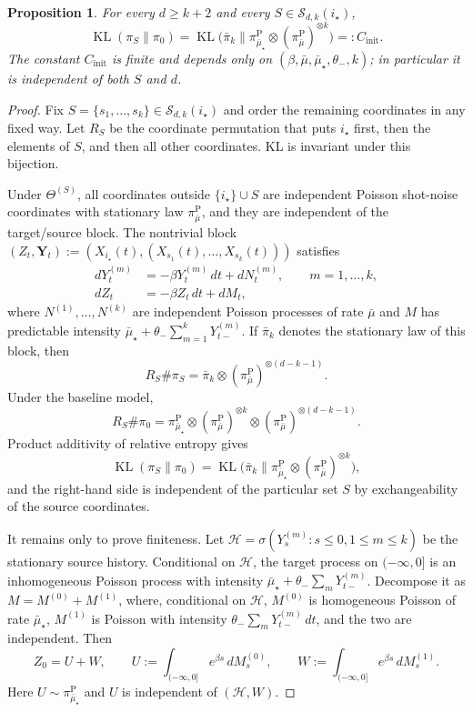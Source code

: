 \documentclass[10pt,a4paper]{amsart}
\newtheorem{proposition}{Proposition}
\newcommand{\KL}{\operatorname{KL}}
\newcommand{\thetalo}{\theta_-}
\begin{document}
\begin{proposition}
\label{prop:app-initKL-k}
For every $d\ge k+2$ and every $S\in\mathcal S_{d,k}(i_\star)$,
\[
\KL(\pi_S\|\pi_0)
=
\KL\!\bigl(\bar\pi_k\|\pi_{\bar\mu_\star}^{\mathrm P}\otimes
(\pi_{\bar\mu}^{\mathrm P})^{\otimes k}\bigr)
=:C_{\mathrm{init}}.
\]
The constant $C_{\mathrm{init}}$ is finite and depends only on
$(\beta,\bar\mu,\bar\mu_\star,\thetalo,k)$; in particular it is independent of
both $S$ and $d$.
\end{proposition}

\begin{proof}
Fix $S=\{s_1,\dots,s_k\}\in\mathcal S_{d,k}(i_\star)$ and order the remaining
coordinates in any fixed way. Let $R_S$ be the coordinate permutation that puts
$i_\star$ first, then the elements of $S$, and then all other coordinates. KL is
invariant under this bijection.

Under $\Theta^{(S)}$, all coordinates outside $\{i_\star\}\cup S$ are independent
Poisson shot-noise coordinates with stationary law $\pi_{\bar\mu}^{\mathrm P}$,
and they are independent of the target/source block. The nontrivial block
$(Z_t,\mathbf Y_t):=(X_{i_\star}(t),(X_{s_1}(t),\dots,X_{s_k}(t)))$ satisfies
\[
\begin{aligned}
dY_t^{(m)}&=-\beta Y_t^{(m)}\,dt+dN_t^{(m)},\qquad m=1,\dots,k,\\
dZ_t&=-\beta Z_t\,dt+dM_t,
\end{aligned}
\]
where $N^{(1)},\dots,N^{(k)}$ are independent Poisson processes of rate
$\bar\mu$ and $M$ has predictable intensity
$\bar\mu_\star+\thetalo\sum_{m=1}^kY_{t-}^{(m)}$. If $\bar\pi_k$ denotes the
stationary law of this block, then
\[
R_S\#\pi_S=\bar\pi_k\otimes(\pi_{\bar\mu}^{\mathrm P})^{\otimes(d-k-1)}.
\]
Under the baseline model,
\[
R_S\#\pi_0=\pi_{\bar\mu_\star}^{\mathrm P}\otimes
(\pi_{\bar\mu}^{\mathrm P})^{\otimes k}\otimes
(\pi_{\bar\mu}^{\mathrm P})^{\otimes(d-k-1)}.
\]
Product additivity of relative entropy gives
\[
\KL(\pi_S\|\pi_0)=
\KL\!\bigl(\bar\pi_k\|\pi_{\bar\mu_\star}^{\mathrm P}\otimes
(\pi_{\bar\mu}^{\mathrm P})^{\otimes k}\bigr),
\]
and the right-hand side is independent of the particular set $S$ by
exchangeability of the source coordinates.

It remains only to prove finiteness. Let
$\mathcal H=\sigma(Y_s^{(m)}:s\le0,1\le m\le k)$ be the stationary source
history. Conditional on $\mathcal H$, the target process on $(-\infty,0]$ is an
inhomogeneous Poisson process with intensity
$\bar\mu_\star+\thetalo\sum_mY_{t-}^{(m)}$. Decompose it as $M=M^{(0)}+M^{(1)}$,
where, conditional on $\mathcal H$, $M^{(0)}$ is homogeneous Poisson of rate
$\bar\mu_\star$, $M^{(1)}$ is Poisson with intensity
$\thetalo\sum_mY_{t-}^{(m)}\,dt$, and the two are independent. Then
\[
Z_0=U+W,
\qquad
U:=\int_{(-\infty,0]}e^{\beta s}\,dM_s^{(0)},\qquad
W:=\int_{(-\infty,0]}e^{\beta s}\,dM_s^{(1)}.
\]
Here $U\sim\pi_{\bar\mu_\star}^{\mathrm P}$ and $U$ is independent of
$(\mathcal H,W)$.


\end{proof}
\end{document}
